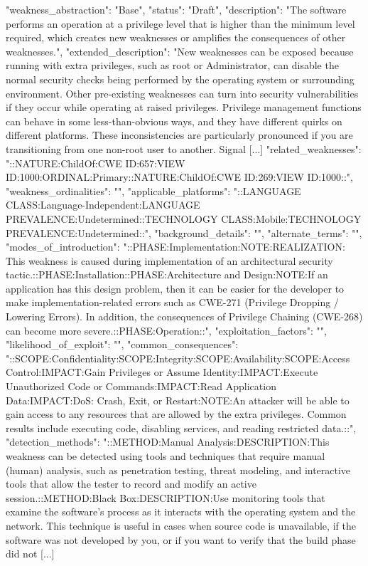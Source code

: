\begin{code}
{{{{{        "weakness_abstraction": "Base",
        "status": "Draft",
        "description": "The software performs an operation at a privilege level that is higher than the minimum level required, which creates new weaknesses or amplifies the consequences of other weaknesses.",
        "extended_description": "New weaknesses can be exposed because running with extra privileges, such as root or Administrator, can disable the normal security checks being performed by the operating system or surrounding environment. Other pre-existing weaknesses can turn into security vulnerabilities if they occur while operating at raised privileges. Privilege management functions can behave in some less-than-obvious ways, and they have different quirks on different platforms. These inconsistencies are particularly pronounced if you are transitioning from one non-root user to another. Signal [...]
        "related_weaknesses": "::NATURE:ChildOf:CWE ID:657:VIEW ID:1000:ORDINAL:Primary::NATURE:ChildOf:CWE ID:269:VIEW ID:1000::",
        "weakness_ordinalities": "",
        "applicable_platforms": "::LANGUAGE CLASS:Language-Independent:LANGUAGE PREVALENCE:Undetermined::TECHNOLOGY CLASS:Mobile:TECHNOLOGY PREVALENCE:Undetermined::",
        "background_details": "",
        "alternate_terms": "",
        "modes_of_introduction": "::PHASE:Implementation:NOTE:REALIZATION: This weakness is caused during implementation of an architectural security tactic.::PHASE:Installation::PHASE:Architecture and Design:NOTE:If an application has this design problem, then it can be easier for the developer to make implementation-related errors such as CWE-271 (Privilege Dropping / Lowering Errors). In addition, the consequences of Privilege Chaining (CWE-268) can become more severe.::PHASE:Operation::",
        "exploitation_factors": "",
        "likelihood_of_exploit": "",
        "common_consequences": "::SCOPE:Confidentiality:SCOPE:Integrity:SCOPE:Availability:SCOPE:Access Control:IMPACT:Gain Privileges or Assume Identity:IMPACT:Execute Unauthorized Code or Commands:IMPACT:Read Application Data:IMPACT:DoS: Crash, Exit, or Restart:NOTE:An attacker will be able to gain access to any resources that are allowed by the extra privileges. Common results include executing code, disabling services, and reading restricted data.::",
        "detection_methods": "::METHOD:Manual Analysis:DESCRIPTION:This weakness can be detected using tools and techniques that require manual (human) analysis, such as penetration testing, threat modeling, and interactive tools that allow the tester to record and modify an active session.::METHOD:Black Box:DESCRIPTION:Use monitoring tools that examine the software's process as it interacts with the operating system and the network. This technique is useful in cases when source code is unavailable, if the software was not developed by you, or if you want to verify that the build phase did not [...]
}}}}}
\end{code}
